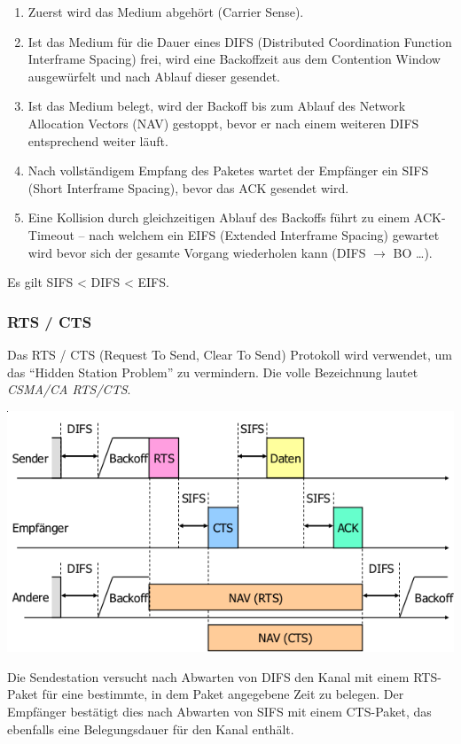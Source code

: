\begin{enumerate}
	\item Zuerst wird das Medium abgehört (Carrier Sense).
	\item Ist das Medium für die Dauer eines DIFS (Distributed Coordination
		Function Interframe Spacing) frei, wird eine Backoffzeit aus dem Contention
		Window ausgewürfelt und nach Ablauf dieser gesendet.
	\item Ist das Medium belegt, wird der Backoff bis zum Ablauf des Network
		Allocation Vectors (NAV) gestoppt, bevor er nach einem weiteren DIFS
		entsprechend weiter läuft.
	\item Nach vollständigem Empfang des Paketes wartet der Empfänger ein SIFS
		(Short Interframe Spacing), bevor das ACK gesendet wird.
	\item Eine Kollision durch gleichzeitigen Ablauf des Backoffs führt zu einem
		ACK-Timeout -- nach welchem ein EIFS (Extended Interframe Spacing) gewartet
		wird bevor sich der gesamte Vorgang wiederholen kann (DIFS $\rightarrow$ BO
		\ldots).
\end{enumerate}

Es gilt SIFS < DIFS < EIFS.


\subsubsection{RTS / CTS}

Das RTS / CTS (Request To Send, Clear To Send) Protokoll wird verwendet, um das
``Hidden Station Problem'' zu vermindern. Die volle Bezeichnung lautet
\textit{CSMA/CA RTS/CTS}.

\begin{center}
	\includegraphics[width=.8\textwidth]{media/rts_cts.png}
\end{center}

Die Sendestation versucht nach Abwarten von DIFS den Kanal mit einem RTS-Paket
für eine bestimmte, in dem Paket angegebene Zeit zu belegen. Der Empfänger
bestätigt dies nach Abwarten von SIFS mit einem CTS-Paket, das ebenfalls eine
Belegungsdauer für den Kanal enthält.

